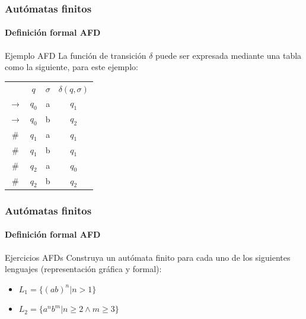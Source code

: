 \documentclass{beamer}
\begin{document}
        \begin{frame}
			\frametitle{Aut\'omatas finitos}
			\framesubtitle{Definici\'on formal AFD}

            \begin{exampleblock}{Ejemplo AFD}
               La funci\'on de transici\'on $\delta$ puede ser expresada mediante una tabla como la siguiente, para este ejemplo:
               
               \begin{center}
                   \begin{tabular}{c|ccc|} 
                   \cline{2-4}
                       & $q$ & $\sigma$ & $\delta(q,\sigma)$ \\ 
                   \cline{2-4}
                       $\rightarrow$ & $q_{0}$ & a & $q_{1}$ \\
                       $\rightarrow$ & $q_{0}$ & b & $q_{2}$ \\
                       \# & $q_{1}$ & a & $q_{1}$ \\
                       \# & $q_{1}$ & b & $q_{1}$ \\
                       \# & $q_{2}$ & a & $q_{0}$ \\
                       \# & $q_{2}$ & b & $q_{2}$ \\
                   \cline{2-4}
                   \end{tabular}
               \end{center}
            \end{exampleblock}
		\end{frame}

        \begin{frame}
			\frametitle{Aut\'omatas finitos}
			\framesubtitle{Definici\'on formal AFD}

            \begin{exampleblock}{Ejercicios AFDs}
               Construya un aut\'omata finito para cada uno de los siguientes lenguajes (representaci\'on gr\'afica y formal):
               \begin{itemize}
                   \item[] $L_{1} = \{(ab)^{n} | n > 1\}$
                   \item[] $L_{2} = \{a^{n}b^{m} | n \geq 2 \wedge m \geq 3\}$
               \end{itemize}
            \end{exampleblock}
		\end{frame}
\end{document}
